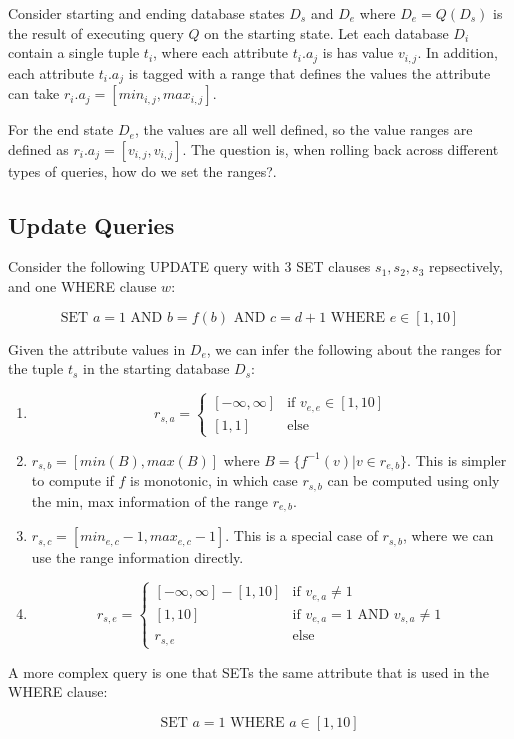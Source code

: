 \documentclass{article}
\begin{document}
Consider starting and ending database states $D_s$ and $D_e$ where
$D_e = Q(D_s)$ is the result of executing query $Q$ on the starting
state.  Let each database $D_i$ contain a single tuple $t_i$, where
each attribute $t_i.a_j$ is has value $v_{i,j}$.  In addition, each
attribute $t_i.a_j$ is tagged with a range that defines the values
the attribute can take $r_i.a_j = [min_{i,j}, max_{i,j}]$.

For the end state $D_e$, the values are all well defined, so the value ranges are
defined as $r_i.a_j = [v_{i,j}, v_{i,j}]$.  The question is, when rolling back
across different types of queries, how do we set the ranges?.

\subsection{Update Queries}

Consider the following UPDATE query with 3 SET clauses $s_1, s_2, s_3$ repsectively,
and one WHERE clause $w$:

\[
\text{SET } a=1 \text{ AND } b=f(b) \text{ AND } c=d+1 \text{ WHERE } e \in [1, 10] 
\]

Given the attribute values in $D_e$, we can infer the following
about the ranges for the tuple $t_s$ in the starting database $D_s$:

\begin{enumerate}
\item \[r_{s,a} = \begin{cases}
[-\infty, \infty] & \mbox{if } v_{e,e} \in [1, 10]\\
[1, 1]            & \text{else}
\end{cases}\]
\item $r_{s,b} = [min(B), max(B)]$ where $B = \{ f^{-1}(v) | v \in r_{e,b} \}$.  
      This is simpler to compute if $f$ is monotonic, in which case $r_{s,b}$ can be computed 
      using only the min, max information of the range $r_{e,b}$.
\item $r_{s,c} = [min_{e,c}-1, max_{e,c}-1]$.  
      This is a special case of $r_{s,b}$, where we can use the range information directly.
\item \[r_{s,e} = \begin{cases}
[-\infty, \infty] - [1,10] & \mbox{if } v_{e,a} \ne 1\\
[1,10]                     & \mbox{if } v_{e,a} = 1 \mbox{ AND } v_{s,a} \ne 1\\
r_{s,e}                    & \mbox{else }
\end{cases}
\]
\end{enumerate}

A more complex query is one that SETs the same attribute that is used in the WHERE clause:

\[
\text{SET } a=1 \text{ WHERE } a \in [1, 10] 
\]
\end{document}
